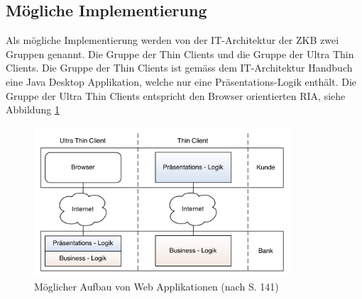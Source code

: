   \subsection{Mögliche Implementierung}
  
  Als mögliche Implementierung werden von der IT-Architektur der \ac{ZKB} zwei
  Gruppen genannt. Die Gruppe der Thin Clients und die Gruppe der Ultra Thin
  Clients. Die Gruppe der Thin Clients ist gemäss dem IT-Architektur Handbuch
  eine Java Desktop Applikation, welche nur eine Präsentations-Logik enthält.
  Die Gruppe der Ultra Thin Clients entspricht den Browser orientierten
  \ac{RIA}, siehe Abbildung \ref{img:zkbWebAnwendungen}
  \newline
  
  \begin{figure}[hbt]
    \begin{center}
      \includegraphics[width=0.85\textwidth]{./image/zkbWebAnwendungen.pdf}
      \caption{Möglicher Aufbau von Web Applikationen (nach
      \cite{ZkbHandbuchDerItArchitektur} S. 141)}
      \label{img:zkbWebAnwendungen}
    \end{center}
  \end{figure}
  